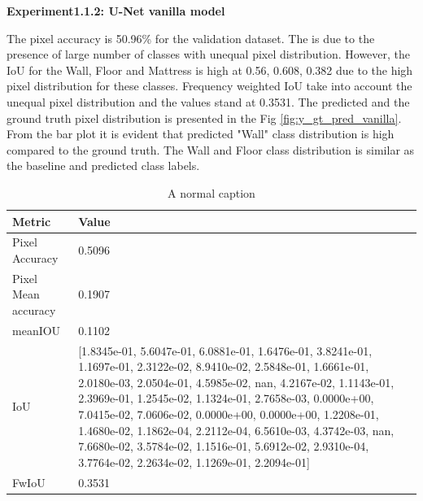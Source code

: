    { \bf Experiment1.1.2: U-Net vanilla model}
    
    The pixel accuracy is 50.96\% for the validation dataset. The is due to the presence of large number of classes with unequal pixel distribution. However, the IoU for the Wall, Floor and Mattress is high at 0.56, 0.608, 0.382 due to the high pixel distribution for these classes. Frequency weighted IoU take into account the unequal pixel distribution and the values stand at 0.3531. The predicted and the ground truth pixel distribution is presented in the Fig \ref{fig:y_gt_pred_vanilla}. From the bar plot it is evident that predicted "Wall" class distribution is high compared to the ground truth. The Wall and Floor class distribution is similar as the baseline and predicted class labels. 
    
   	
   	\begin{table}
    \begin{center}
    	\begin{tabular}{ | l | p{12cm} |}
    		\hline
    		
    		\cellcolor{purple!30}Metric & \cellcolor{purple!30}Value \\ \hline
    		Pixel Accuracy & 0.5096 \\ \hline
    		Pixel Mean accuracy & 0.1907  \\ \hline
    		meanIOU & 0.1102 \\ \hline
    		IoU & [1.8345e-01, 5.6047e-01, 6.0881e-01, 1.6476e-01, 3.8241e-01, 1.1697e-01, 
    		2.3122e-02, 8.9410e-02, 2.5848e-01, 1.6661e-01, 2.0180e-03, 2.0504e-01, 
    		4.5985e-02,        nan, 4.2167e-02, 1.1143e-01, 2.3969e-01, 1.2545e-02, 
    		1.1324e-01, 2.7658e-03, 0.0000e+00, 7.0415e-02, 7.0606e-02, 0.0000e+00,  
    		0.0000e+00, 1.2208e-01, 1.4680e-02, 1.1862e-04, 2.2112e-04, 6.5610e-03, 
    		4.3742e-03,        nan, 7.6680e-02, 3.5784e-02, 1.1516e-01, 5.6912e-02, 
    		2.9310e-04, 3.7764e-02, 2.2634e-02, 1.1269e-01, 2.2094e-01] \\ \hline
    		FwIoU & 0.3531 \\ \hline
    		\hline
    	\end{tabular}
   		\caption{A normal caption}
	    \label{tab:caption}
    \end{center}
	\end{table}

